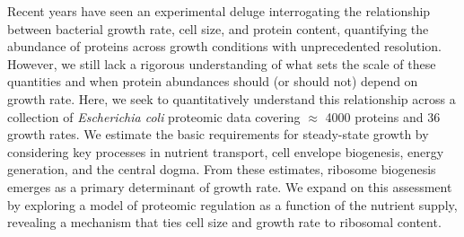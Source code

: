 Recent years have seen an experimental deluge interrogating the relationship
between bacterial growth rate, cell size, and protein content, quantifying the
abundance of proteins across growth conditions with unprecedented resolution.
However, we still lack a rigorous understanding of what sets the scale of these
quantities and when protein abundances should (or should not) depend on growth
rate. Here, we seek to quantitatively understand this relationship across a
collection of \textit{Escherichia coli} proteomic data covering $\approx$ 4000
proteins and 36 growth rates. We estimate the basic requirements for
steady-state growth by considering key processes in nutrient transport, cell envelope biogenesis, energy
generation, and the central dogma. From these
estimates, ribosome biogenesis emerges as a primary determinant of growth rate.
We expand on this assessment by exploring a model of proteomic regulation as a
function of the nutrient supply, revealing a mechanism that ties cell size and
growth rate to ribosomal content.
